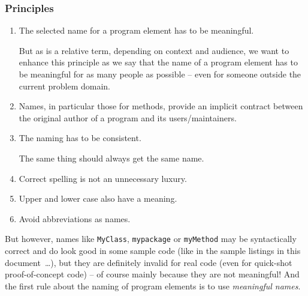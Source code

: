 \subsubsection{Principles}
\begin{enumerate}[label=P\arabic*.]
	\item{The selected name for a program element has to be meaningful.

But as  is a relative term, depending on context and audience, we want to enhance this principle as we say that the name of a program element has to be meaningful for as many people as possible – even for someone outside the current problem domain.}
	\item{Names, in particular those for methods, provide an implicit contract between the original author of a program and its users/maintainers.}
	\item{The naming has to be consistent.

The same thing should always get the same name.}

	\item{Correct spelling is not an unnecessary luxury.}

	\item{Upper and lower case also have a meaning.}
	
	\item{Avoid abbreviations as names.}
\end{enumerate}

But however, names like \lstinline|MyClass|, \lstinline|mypackage| or \lstinline|myMethod| may be syntactically correct and do look good in some sample code (like in the sample listings in this document~…), but they are definitely invalid for real code (even for quick-shot proof-of-concept code) – of course mainly because they are not meaningful! And the first rule about the naming of program elements is to use \textit{meaningful names}. 









